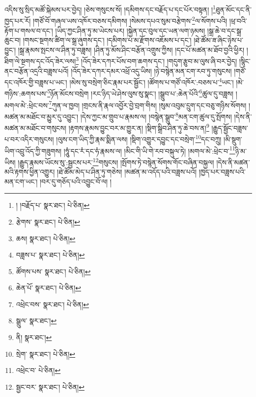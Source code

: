 འདིས་སུ་སྲིད་མཚོ་སྐེམས་པར་བྱེད། །ཅེས་གསུངས་སོ། །དམིགས་དང་བརྗོད་པ་དང་པོར་བསྟན། །\footnote{། །བརྗོད་པ་  སྣར་ཐང་།  པེ་ཅིན། }ཐུན་མོང་དང་ནི་ཁྱད་པར་རོ། །གཙོ་བོ་གཞལ་ཡས་འཁོར་བཅས་དམིགས། །སེམས་དཔའ་སུམ་བརྩེགས་\footnote{རྩེགས་  སྣར་ཐང་།  པེ་ཅིན། }ལ་སོགས་པའི། །ཕྲ་བའི་རྟོག་པ་གསལ་བ་དང་། །ཡིད་ཀྱང་ཤིན་ཏུ་མ་ཡེངས་པར། །སྐྱེན་དང་བུལ་དང་ཡན་ལག་ཉམས། །སྒྲ་ཆེ་བ་དང་སྒྲ་ཆུང་བ། །གསང་སྔགས་ཚིག་ལ་སྒྲ་ཞུགས་དང་། །དམིགས་པ་མ་རྫོགས་འཇོམས་པ་དང་། །ཐེ་ཚོམ་ཟ་ཞིང་ཉེས་པ་བྱུང་། །སྒྲ་རྣམས་སྤངས་ལ་ཤིན་ཏུ་བཟླས། །ཤིན་ཏུ་མོས་ཤིང་བརྩོན་འགྲུས་ཀྱིས། །དང་པོ་མཚན་མ་ཐོབ་བྱའི་ཕྱིར། །ཐིག་ལེ་སྔགས་དང་འོད་ཟེར་ལས།\footnote{ཆས།  སྣར་ཐང་།  པེ་ཅིན། } །འོད་ཟེར་དཀར་པོས་བག་ཆགས་དང་། །གདུག་རྩུབ་མ་ལུས་ཞི་བར་བྱེད། །སྙིང་ནང་བརྩོན་འདྲའི་བཟླས་པའོ། །འོད་ཟེར་དཀར་དམར་འཕྲོ་འདུ་ཡིས། །ཉེ་བསྙེན་མན་ངག་རབ་ཏུ་གསུངས། །གཙོ་དང་འཁོར་གྱི་བཟླས་པ་ཡང་། །མེས་སུ་བསྲེག་ཅིང་རྣམ་པར་སྦྱོང་། །ཚོགས་པ་གཙོ་འཁོར་:བཅས་པ་\footnote{བཟླས་པ་  སྣར་ཐང་།  པེ་ཅིན། }ཡང་། །མེ་གཉིས་:ཆགས་པས་\footnote{ཚོགས་པས་  སྣར་ཐང་།  པེ་ཅིན། }ཉོན་མོངས་བསྲེག །རང་ཉིད་ཡེ་ཤེས་ལུས་སུ་སྣང་། །སྒྲུབ་པ་:ཆེན་པོའི་\footnote{ཆེན་པོ་  སྣར་ཐང་།  པེ་ཅིན། }ཚུལ་དུ་བཟླས། །མགལ་མེ་:ཕྲེང་བས་\footnote{འཕྲེང་བས་  སྣར་ཐང་།  པེ་ཅིན། }ཀུན་ལ་ཁྱབ། །གྲངས་ནི་རྣལ་འབྱོར་བྱེ་བྲག་གིས། །སུམ་འབུམ་དྲུག་དང་བཅུ་གཉིས་སོགས། །མཚན་མ་མཐོང་བ་མྱུར་དུ་འབྱུང་། །དེས་ཀྱང་མ་གྲུབ་པ་རྣམས་ལ། །བསྙེན་སྒྲུབ་\footnote{སྒྲུལ་  སྣར་ཐང་། }མན་ངག་ཚུལ་དུ་སྤོགས། །དེས་ནི་མཚན་མ་མཐོང་བ་གསུངས། །རྟགས་རྣམས་བྱུང་བར་མ་གྱུར་ན། །སྡིག་སྒྲིབ་ཤིན་ཏུ་ཆེ་བས་ན།\footnote{ནི།  སྣར་ཐང་། } །རྒྱུད་སྦྱོང་བཟླས་པ་བར་འདིར་གསུངས། །ལུས་ངག་ཡིད་ཀྱི་རྣམ་སྨིན་ལས། །སྡིག་འགྱུར་དབྱུང་དང་བསྲེག་\footnote{སྲེག་  སྣར་ཐང་།  པེ་ཅིན། }དང་བཀྲུ། །མི་སྡུག་ཡིག་འབྲུ་འོད་ཀྱི་གཟུགས། །ཧཱུཾ་དང་རཾ་དང་ཧཾ་རྣམས་ལ། །མིང་གི་ཡི་གེ་རབ་བསྐུལ་ཏེ། །མགལ་མེ་:ཕྲེང་བ་\footnote{འཕྲེང་བ་  པེ་ཅིན། }ཉི་མ་ཡིས། །རྒྱུད་རྣམས་ཡོངས་སུ་:སྦྱངས་པར་\footnote{སྦྱང་བར་  སྣར་ཐང་།  པེ་ཅིན། }གསུངས། །སྤོགས་ཏེ་བསྙེན་སོགས་གོང་བཞིན་བསྐྱལ། །དེས་ནི་མཚན་མའི་རྟགས་ཕྱིན་འགྱུར། །ཐེ་ཚོམ་མེད་པ་ཤིན་ཏུ་གཅེས། །མཚན་མ་འདོད་པའི་བཟླས་པའོ། །ཁྱད་པར་བཟླས་པའི་མན་ངག་ཡང་། །བར་དུ་གཅོད་པའི་འབྱུང་བོ་ལ། །
